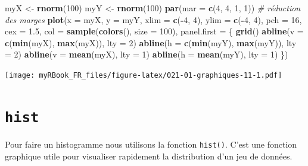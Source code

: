 \documentclass[
]{book}
\newenvironment{Shaded}{\begin{snugshade}}{\end{snugshade}}
\newcommand{\CommentTok}[1]{\textcolor[rgb]{0.56,0.35,0.01}{\textit{#1}}}
\newcommand{\DataTypeTok}[1]{\textcolor[rgb]{0.13,0.29,0.53}{#1}}
\newcommand{\DecValTok}[1]{\textcolor[rgb]{0.00,0.00,0.81}{#1}}
\newcommand{\FloatTok}[1]{\textcolor[rgb]{0.00,0.00,0.81}{#1}}
\newcommand{\KeywordTok}[1]{\textcolor[rgb]{0.13,0.29,0.53}{\textbf{#1}}}
\newcommand{\NormalTok}[1]{#1}
\newcommand{\OperatorTok}[1]{\textcolor[rgb]{0.81,0.36,0.00}{\textbf{#1}}}
\newcommand{\StringTok}[1]{\textcolor[rgb]{0.31,0.60,0.02}{#1}}
\begin{document}
\begin{Shaded}
\begin{Highlighting}[]
\NormalTok{myX <-}\StringTok{ }\KeywordTok{rnorm}\NormalTok{(}\DecValTok{100}\NormalTok{)}
\NormalTok{myY <-}\StringTok{ }\KeywordTok{rnorm}\NormalTok{(}\DecValTok{100}\NormalTok{)}
\KeywordTok{par}\NormalTok{(}\DataTypeTok{mar =} \KeywordTok{c}\NormalTok{(}\DecValTok{4}\NormalTok{, }\DecValTok{4}\NormalTok{, }\DecValTok{1}\NormalTok{, }\DecValTok{1}\NormalTok{)) }\CommentTok{# réduction des marges}
\KeywordTok{plot}\NormalTok{(}\DataTypeTok{x =}\NormalTok{ myX, }\DataTypeTok{y =}\NormalTok{ myY, }
  \DataTypeTok{xlim =} \KeywordTok{c}\NormalTok{(}\OperatorTok{-}\DecValTok{4}\NormalTok{, }\DecValTok{4}\NormalTok{), }\DataTypeTok{ylim =} \KeywordTok{c}\NormalTok{(}\OperatorTok{-}\DecValTok{4}\NormalTok{, }\DecValTok{4}\NormalTok{),   }
  \DataTypeTok{pch =} \DecValTok{16}\NormalTok{, }\DataTypeTok{cex =} \FloatTok{1.5}\NormalTok{, }
  \DataTypeTok{col =} \KeywordTok{sample}\NormalTok{(}\KeywordTok{colors}\NormalTok{(), }\DataTypeTok{size =} \DecValTok{100}\NormalTok{),}
  \DataTypeTok{panel.first =}\NormalTok{ \{}
    \KeywordTok{grid}\NormalTok{()}
    \KeywordTok{abline}\NormalTok{(}\DataTypeTok{v =} \KeywordTok{c}\NormalTok{(}\KeywordTok{min}\NormalTok{(myX), }\KeywordTok{max}\NormalTok{(myX)), }\DataTypeTok{lty =} \DecValTok{2}\NormalTok{)}
    \KeywordTok{abline}\NormalTok{(}\DataTypeTok{h =} \KeywordTok{c}\NormalTok{(}\KeywordTok{min}\NormalTok{(myY), }\KeywordTok{max}\NormalTok{(myY)), }\DataTypeTok{lty =} \DecValTok{2}\NormalTok{)}
    \KeywordTok{abline}\NormalTok{(}\DataTypeTok{v =} \KeywordTok{mean}\NormalTok{(myX), }\DataTypeTok{lty =} \DecValTok{1}\NormalTok{)}
    \KeywordTok{abline}\NormalTok{(}\DataTypeTok{h =} \KeywordTok{mean}\NormalTok{(myY), }\DataTypeTok{lty =} \DecValTok{1}\NormalTok{)}
\NormalTok{\})}
\end{Highlighting}
\end{Shaded}

\texttt{[image: myRBook\_FR\_files/figure-latex/021-01-graphiques-11-1.pdf]}

\hypertarget{graph1hist}{%
\section{\texorpdfstring{\texttt{hist}}{hist}}\label{graph1hist}}

Pour faire un histogramme nous utilisons la fonction \texttt{hist()}. C'est une fonction graphique utile pour visualiser rapidement la distribution d'un jeu de données.
\end{document}
